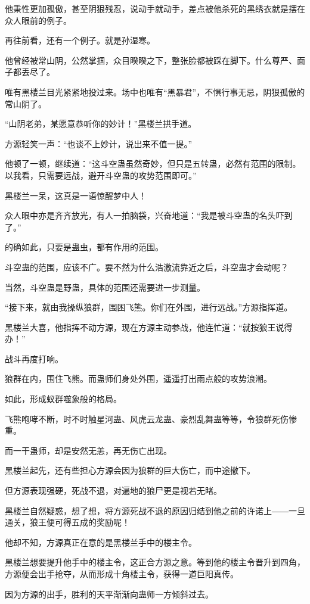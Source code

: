\begin{this_body}
他秉性更加孤傲，甚至阴狠残忍，说动手就动手，差点被他杀死的黑绣衣就是摆在众人眼前的例子。

再往前看，还有一个例子。就是孙湿寒。

他曾经被常山阴，公然掌掴，众目睽睽之下，整张脸都被踩在脚下。什么尊严、面子都丢尽了。

唯有黑楼兰目光紧紧地投过来。场中也唯有“黑暴君”，不惧行事无忌，阴狠孤傲的常山阴了。

“山阴老弟，某愿意恭听你的妙计！”黑楼兰拱手道。

方源轻笑一声：“也谈不上妙计，说出来不值一提。”

他顿了一顿，继续道：“这斗空蛊虽然奇妙，但只是五转蛊，必然有范围的限制。以我看，只需要远战，避开斗空蛊的攻势范围即可。”

黑楼兰一呆，这真是一语惊醒梦中人！

众人眼中亦是齐齐放光，有人一拍脑袋，兴奋地道：“我是被斗空蛊的名头吓到了。”

的确如此，只要是蛊虫，都有作用的范围。

斗空蛊的范围，应该不广。要不然为什么浩激流靠近之后，斗空蛊才会动呢？

当然，斗空蛊是野蛊，具体的范围还需要进一步测量。

“接下来，就由我操纵狼群，围困飞熊。你们在外围，进行远战。”方源指挥道。

黑楼兰大喜，他指挥不动方源，现在方源主动参战，他连忙道：“就按狼王说得办！”

战斗再度打响。

狼群在内，围住飞熊。而蛊师们身处外围，遥遥打出雨点般的攻势浪潮。

如此，形成蚁群噬象般的格局。

飞熊咆哮不断，时不时触星河蛊、风虎云龙蛊、豪烈乱舞蛊等等，令狼群死伤惨重。

而一干蛊师，却是安然无恙，再无伤亡出现。

黑楼兰起先，还有些担心方源会因为狼群的巨大伤亡，而中途撤下。

但方源表现强硬，死战不退，对遍地的狼尸更是视若无睹。

黑楼兰自然疑惑，想了想，将方源死战不退的原因归结到他之前的许诺上――一旦通关，狼王便可得五成的奖励呢！

他却不知，方源真正在意的是黑楼兰手中的楼主令。

黑楼兰想要提升他手中的楼主令，这正合方源之意。等到他的楼主令晋升到四角，方源便会出手抢夺，从而形成十角楼主令，获得一道巨阳真传。

因为方源的出手，胜利的天平渐渐向蛊师一方倾斜过去。


\end{this_body}
